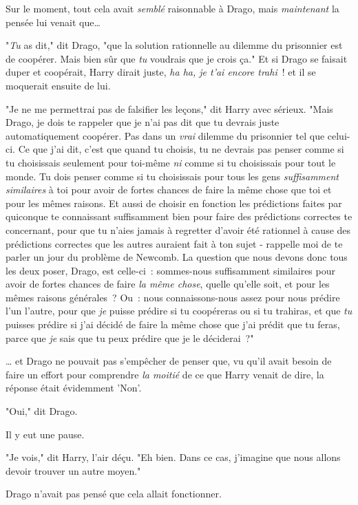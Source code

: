 Sur le moment, tout cela avait \emph{semblé} raisonnable à Drago, mais \emph{maintenant} la pensée lui venait que…

"\emph{Tu} as dit," dit Drago, "que la solution rationnelle au dilemme du prisonnier est de coopérer. Mais bien sûr que \emph{tu} voudrais que je crois ça." Et si Drago se faisait duper et coopérait, Harry dirait juste, \emph{ha ha, je t'ai encore trahi}~! et il se moquerait ensuite de lui.

"Je ne me permettrai pas de falsifier les leçons," dit Harry avec sérieux. "Mais Drago, je dois te rappeler que je n'ai pas dit que tu devrais juste automatiquement coopérer. Pas dans un \emph{vrai} dilemme du prisonnier tel que celui-ci. Ce que j'ai dit, c'est que quand tu choisis, tu ne devrais pas penser comme si tu choisissais seulement pour toi-même \emph{ni} comme si tu choisissais pour tout le monde. Tu dois penser comme si tu choisissais pour tous les gens \emph{suffisamment similaires} à toi pour avoir de fortes chances de faire la même chose que toi et pour les mêmes raisons. Et aussi de choisir en fonction les prédictions faites par quiconque te connaissant suffisamment bien pour faire des prédictions correctes te concernant, pour que tu n'aies jamais à regretter d'avoir été rationnel à cause des prédictions correctes que les autres auraient fait à ton sujet - rappelle moi de te parler un jour du problème de Newcomb. La question que nous devons donc tous les deux poser, Drago, est celle-ci~: sommes-nous suffisamment similaires pour avoir de fortes chances de faire \emph{la même chose}, quelle qu'elle soit, et pour les mêmes raisons générales~? Ou~: nous connaissons-nous assez pour nous prédire l'un l'autre, pour que \emph{je} puisse prédire si tu coopéreras ou si tu trahiras, et que \emph{tu} puisses prédire si j'ai décidé de faire la même chose que j'ai prédit que tu feras, parce que \emph{je} sais que tu peux prédire que je le déciderai~?"

… et Drago ne pouvait pas s'empêcher de penser que, vu qu'il avait besoin de faire un effort pour comprendre \emph{la moitié} de ce que Harry venait de dire, la réponse était évidemment 'Non'.

"Oui," dit Drago.

Il y eut une pause.

"Je vois," dit Harry, l'air déçu. "Eh bien. Dans ce cas, j'imagine que nous allons devoir trouver un autre moyen."

Drago n'avait pas pensé que cela allait fonctionner.


